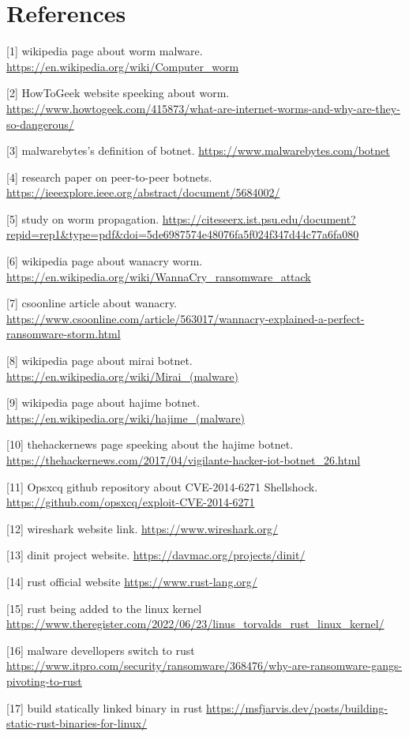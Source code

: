 \documentclass[../main.tex]{subfiles}
\begin{document}
	\chapter*{References}
	{

        [1] wikipedia page about worm malware. \url{https://en.wikipedia.org/wiki/Computer_worm}

        [2] HowToGeek website speeking about worm.
        \url{https://www.howtogeek.com/415873/what-are-internet-worms-and-why-are-they-so-dangerous/}

        [3] malwarebytes's definition of botnet.
        \url{https://www.malwarebytes.com/botnet}

        [4] research paper on peer-to-peer botnets.
        \url{https://ieeexplore.ieee.org/abstract/document/5684002/}

        [5] study on worm propagation.
        \url{https://citeseerx.ist.psu.edu/document?repid=rep1&type=pdf&doi=5de6987574e48076fa5f024f347d44c77a6fa080}

        [6] wikipedia page about wanacry worm.
        \url{https://en.wikipedia.org/wiki/WannaCry_ransomware_attack}

        [7] csoonline article about wanacry.
        \url{https://www.csoonline.com/article/563017/wannacry-explained-a-perfect-ransomware-storm.html}

        [8] wikipedia page about mirai botnet.
        \url{https://en.wikipedia.org/wiki/Mirai_(malware)}

        [9] wikipedia page about hajime botnet.
        \url{https://en.wikipedia.org/wiki/hajime_(malware)}

        [10] thehackernews page speeking about the hajime botnet.
        \url{https://thehackernews.com/2017/04/vigilante-hacker-iot-botnet_26.html}

        [11] Opsxcq github repository about CVE-2014-6271 Shellshock.
        \url{https://github.com/opsxcq/exploit-CVE-2014-6271}

        [12] wireshark website link.
        \url{https://www.wireshark.org/}

        [13] dinit project website.
        \url{https://davmac.org/projects/dinit/}

        [14] rust official website
        \url{https://www.rust-lang.org/}

        [15] rust being added to the linux kernel
        \url{https://www.theregister.com/2022/06/23/linus_torvalds_rust_linux_kernel/}

        [16] malware devellopers switch to rust
        \url{https://www.itpro.com/security/ransomware/368476/why-are-ransomware-gangs-pivoting-to-rust}

        [17] build statically linked binary in rust
        \url{https://msfjarvis.dev/posts/building-static-rust-binaries-for-linux/}

		\vspace{10pt}

	}
\end{document}
